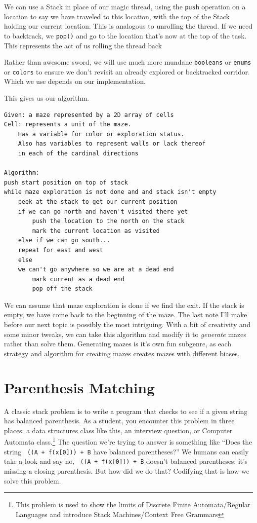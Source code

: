 We can use a Stack in place of our magic thread, using the \texttt{push} operation on a location to say we have traveled to this location, with the top of the Stack holding our current location.  This is analogous to unrolling the thread. If we need to backtrack, we \texttt{pop()} and go to the location that's now at the top of the task.  This represents the act of us rolling the thread back

Rather than awesome sword, we will use much more mundane \texttt{booleans} or \texttt{enums} or \texttt{colors} to ensure we don't revisit an already explored or backtracked corridor.  Which we use depends on our implementation.


This gives us our algorithm.

\begin{verbatim}
Given: a maze represented by a 2D array of cells
Cell: represents a unit of the maze. 
    Has a variable for color or exploration status.
    Also has variables to represent walls or lack thereof
    in each of the cardinal directions

Algorithm:
push start position on top of stack
while maze exploration is not done and and stack isn't empty
    peek at the stack to get our current position
    if we can go north and haven't visited there yet
        push the location to the north on the stack
        mark the current location as visited
    else if we can go south...
    repeat for east and west
    else
    we can't go anywhere so we are at a dead end
        mark current as a dead end
        pop off the stack
\end{verbatim}


We can assume that maze exploration is done if we find the exit.  If the stack is empty, we have come back to the beginning of the maze.  
The last note I'll make before our next topic is possibly the most intriguing.  With a bit of creativity and some minor tweaks, we can take this algorithm and modify it to \textit{generate} mazes rather than solve them. Generating mazes is it's own fun subgenre, as each strategy and algorithm for creating mazes creates mazes with different biases. 


\section{Parenthesis Matching}

A classic stack problem is to write a program that checks to see if a given string has balanced parenthesis.  As a student, you encounter this problem in three places: a data structures class like this, an interview question, or Computer Automata class.\footnote{This problem is used to show the limits of Discrete Finite Automata/Regular Languages and introduce Stack Machines/Context Free Grammars}
The question we're trying to answer is something like ``Does the string \texttt{ ((A + f(x[0])) + B} have balanced parentheses?''  We humans can easily take a look and say no, \texttt{ ((A + f(x[0])) + B} doesn't balanced parentheses; it's missing a closing parenthesis.  But how did we do that?  Codifying that is how we solve this problem.  


